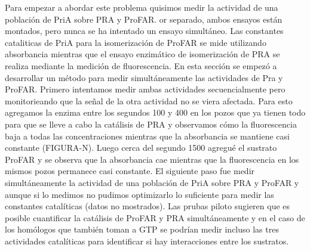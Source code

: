 \documentclass[12pt,twoside]{reedthesis}
\begin{document}
  Para empezar a abordar este problema quisimos medir la actividad de una
  población de PriA sobre PRA y ProFAR. or separado, ambos ensayos están
  montados, pero nunca se ha intentado un ensayo simultáneo. Las
  constantes cataliticas de PriA para la isomerización de ProFAR se mide
  utilizando absorbancia mientras que el ensayo enzimático de
  isomerización de PRA se realiza mediante la medición de fluorescencia.
  En esta sección se empezó a desarrollar un método para medir
  simultáneamente las actividades de Pra y ProFAR. Primero intentamos
  medir ambas actividades secuencialmente pero monitorieando que la señal
  de la otra actividad no se viera afectada. Para esto agregamos la enzima
  entre los segundos 100 y 400 en los pozos que ya tienen todo para que se
  lleve a cabo la catálisis de PRA y observamos cómo la fluorescencia baja
  a todas las concentraciones mientras que la absorbancia se mantiene casi
  constante (FIGURA-N). Luego cerca del segundo 1500 agregué el sustrato
  ProFAR y se observa que la absorbancia cae mientras que la fluorescencia
  en los mismos pozos permanece casi constante. El siguiente paso fue
  medir simultáneamente la actividad de una población de PriA sobre PRA y
  ProFAR y aunque si lo medimos no pudimos optimizarlo lo suficiente para
  medir las constantes catalíticas (datos no mostrados). Las prubas piloto
  sugieren que es posible cuantificar la catálisis de ProFAR y PRA
  simultáneamente y en el caso de los homólogos que también toman a GTP se
  podrían medir incluso las tres actividades catalíticas para identificar
  si hay interacciones entre los sustratos.
  
\end{document}
